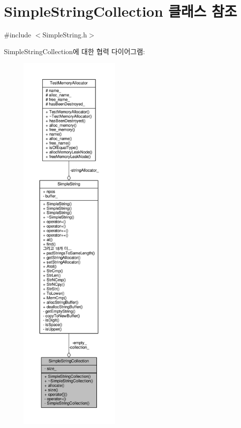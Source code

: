\hypertarget{class_simple_string_collection}{}\section{Simple\+String\+Collection 클래스 참조}
\label{class_simple_string_collection}


{\ttfamily \#include $<$Simple\+String.\+h$>$}



Simple\+String\+Collection에 대한 협력 다이어그램\+:
\nopagebreak
\begin{figure}[H]
\begin{center}
\leavevmode
\includegraphics[height=550pt]{class_simple_string_collection__coll__graph}
\end{center}
\end{figure}

